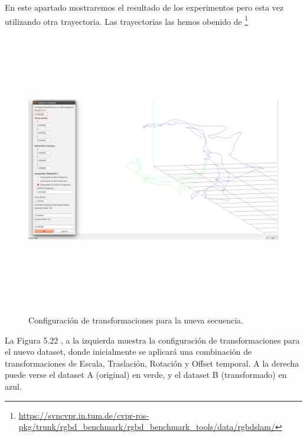 En este apartado mostraremos el resultado de los experimentos pero esta vez utilizando otra trayectoria. Las trayectorias las hemos obenido de \footnote{\url{https://svncvpr.in.tum.de/cvpr-ros-pkg/trunk/rgbd_benchmark/rgbd_benchmark_tools/data/rgbdslam/}}

\begin{figure}
\begin{center}
\label{fig:opciones de View}\includegraphics[height=12.0cm,width=18.0cm]{img/cap6/newData_Transformations.png}
\hspace{0.5cm}

\end{center}

\caption{ Configuración de transformaciones para la nueva secuencia.}
\end{figure}

La Figura 5.22 , a la izquierda muestra la configuración de transformaciones para el nuevo dataset, donde inicialmente se aplicará una combinación de transformaciones de Escala, Traslación, Rotación y Offset temporal. A la derecha puede verse el dataset A (original) en verde, y el dataset B (transformado) en azul.



